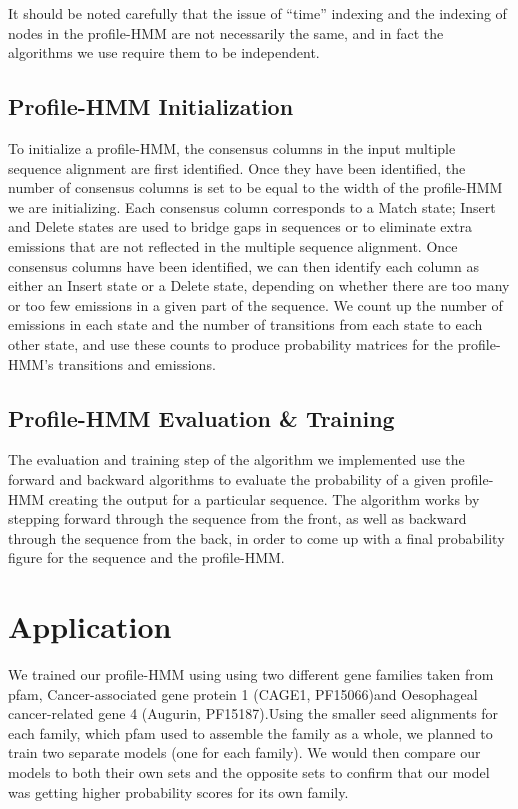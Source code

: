 \documentclass{article}
\begin{document}
It should be noted carefully that the issue of ``time'' indexing and the indexing of nodes in the profile-HMM are not necessarily the same, and in fact the algorithms we use require them to be independent.

\subsection{Profile-HMM Initialization}

To initialize a profile-HMM, the consensus columns in the input multiple sequence alignment are first identified. Once they have been identified, the number of consensus columns is set to be equal to the width of the profile-HMM we are initializing. Each consensus column corresponds to a Match state; Insert and Delete states are used to bridge gaps in sequences or to eliminate extra emissions that are not reflected in the multiple sequence alignment. Once consensus columns have been identified, we can then identify each column as either an Insert state or a Delete state, depending on whether there are too many or too few emissions in a given part of the sequence. We count up the number of emissions in each state and the number of transitions from each state to each other state, and use these counts to produce probability matrices for the profile-HMM's transitions and emissions.

\subsection{Profile-HMM Evaluation \& Training}
The evaluation and training step of the algorithm we implemented use the forward and backward algorithms to evaluate the probability of a given profile-HMM creating the output for a particular sequence. The algorithm works by stepping forward through the sequence from the front, as well as backward through the sequence from the back, in order to come up with a final probability figure for the sequence and the profile-HMM.


\section{Application}
We trained our profile-HMM using using two different gene families taken from pfam, Cancer-associated gene protein 1 (CAGE1, PF15066)\footnotemark[3] and Oesophageal cancer-related gene 4 (Augurin, PF15187).\footnotemark[4] Using the smaller seed alignments for each family, which pfam used to assemble the family as a whole, we planned to train two separate models (one for each family). We would then compare our models to both their own sets and the opposite sets to confirm that our model was getting higher probability scores for its own family.
\end{document}
